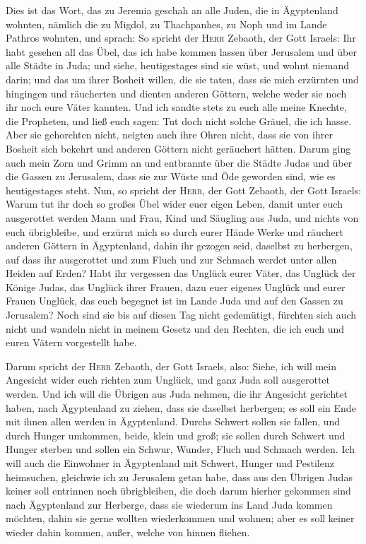 Dies ist das Wort, das zu Jeremia geschah an alle Juden,
die in Ägyptenland wohnten, nämlich die zu Migdol, zu Thachpanhes, zu
Noph und im Lande Pathros wohnten, und sprach:  So spricht
der \textsc{Herr} Zebaoth, der Gott Israels: Ihr habt gesehen all das
Übel, das ich habe kommen lassen über Jerusalem und über alle Städte in
Juda; und siehe, heutigestages sind sie wüst, und wohnt niemand darin;
 und das um ihrer Bosheit willen, die sie taten, dass sie
mich erzürnten und hingingen und räucherten und dienten anderen Göttern,
welche weder sie noch ihr noch eure Väter kannten.  Und
ich sandte stets zu euch alle meine Knechte, die Propheten, und ließ
euch sagen: Tut doch nicht solche Gräuel, die ich hasse. 
Aber sie gehorchten nicht, neigten auch ihre Ohren nicht, dass sie von
ihrer Bosheit sich bekehrt und anderen Göttern nicht geräuchert hätten.
 Darum ging auch mein Zorn und Grimm an und entbrannte
über die Städte Judas und über die Gassen zu Jerusalem, dass sie zur
Wüste und Öde geworden sind, wie es heutigestages steht. 
Nun, so spricht der \textsc{Herr}, der Gott Zebaoth, der Gott Israels:
Warum tut ihr doch so großes Übel wider euer eigen Leben, damit unter
euch ausgerottet werden Mann und Frau, Kind und Säugling aus Juda, und
nichts von euch übrigbleibe,  und erzürnt mich so durch
eurer Hände Werke und räuchert anderen Göttern in Ägyptenland, dahin ihr
gezogen seid, daselbst zu herbergen, auf dass ihr ausgerottet und zum
Fluch und zur Schmach werdet unter allen Heiden auf Erden?
 Habt ihr vergessen das Unglück eurer Väter, das Unglück
der Könige Judas, das Unglück ihrer Frauen, dazu euer eigenes Unglück
und eurer Frauen Unglück, das euch begegnet ist im Lande Juda und auf
den Gassen zu Jerusalem?  Noch sind sie bis auf diesen
Tag nicht gedemütigt, fürchten sich auch nicht und wandeln nicht in
meinem Gesetz und den Rechten, die ich euch und euren Vätern vorgestellt
habe.

 Darum spricht der \textsc{Herr} Zebaoth, der Gott
Israels, also: Siehe, ich will mein Angesicht wider euch richten zum
Unglück, und ganz Juda soll ausgerottet werden.  Und ich
will die Übrigen aus Juda nehmen, die ihr Angesicht gerichtet haben,
nach Ägyptenland zu ziehen, dass sie daselbst herbergen; es soll ein
Ende mit ihnen allen werden in Ägyptenland. Durchs Schwert sollen sie
fallen, und durch Hunger umkommen, beide, klein und groß; sie sollen
durch Schwert und Hunger sterben und sollen ein Schwur, Wunder, Fluch
und Schmach werden.  Ich will auch die Einwohner in
Ägyptenland mit Schwert, Hunger und Pestilenz heimsuchen, gleichwie ich
zu Jerusalem getan habe,  dass aus den Übrigen Judas
keiner soll entrinnen noch übrigbleiben, die doch darum hierher gekommen
sind nach Ägyptenland zur Herberge, dass sie wiederum ins Land Juda
kommen möchten, dahin sie gerne wollten wiederkommen und wohnen; aber es
soll keiner wieder dahin kommen, außer, welche von hinnen fliehen.

